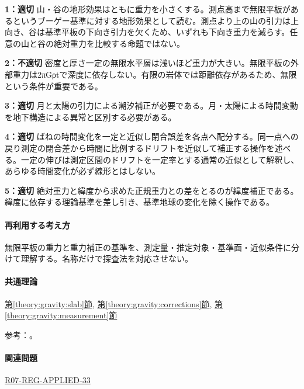 \noindent\textbf{1：適切} 山・谷の地形効果はともに重力を小さくする。測点高まで無限平板があるというブーゲー基準に対する地形効果として読む。測点より上の山の引力は上向き、谷は基準平板の下向き引力を欠くため、いずれも下向き重力を減らす。任意の山と谷の絶対重力を比較する命題ではない。\par

\noindent\textbf{2：不適切} 密度と厚さ一定の無限水平層は浅いほど重力が大きい。無限平板の外部重力は2πGρtで深度に依存しない。有限の岩体では距離依存があるため、無限という条件が重要である。\par

\noindent\textbf{3：適切} 月と太陽の引力による潮汐補正が必要である。月・太陽による時間変動を地下構造による異常と区別する必要がある。\par

\noindent\textbf{4：適切} ばねの時間変化を一定と近似し閉合誤差を各点へ配分する。同一点への戻り測定の閉合差から時間に比例するドリフトを近似して補正する操作を述べる。一定の伸びは測定区間のドリフトを一定率とする通常の近似として解釈し、あらゆる時間変化が必ず線形とはしない。\par

\noindent\textbf{5：適切} 絶対重力と緯度から求めた正規重力との差をとるのが緯度補正である。緯度に依存する理論基準を差し引き、基準地球の変化を除く操作である。\par

\paragraph{再利用する考え方} 無限平板の重力と重力補正の基準を、測定量・推定対象・基準面・近似条件に分けて理解する。名称だけで探査法を対応させない。

\paragraph{共通理論} \hyperref[theory:gravity:slab]{第\ref*{theory:gravity:slab}節}, \hyperref[theory:gravity:corrections]{第\ref*{theory:gravity:corrections}節}, \hyperref[theory:gravity:measurement]{第\ref*{theory:gravity:measurement}節}

\par 参考：\cite{gsi_gravity_definitions}。

\paragraph{関連問題} \hyperref[q:r07-reg-applied-33]{R07-REG-APPLIED-33}

